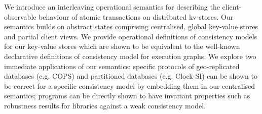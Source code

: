 
We introduce an interleaving operational semantics for describing the
client-observable behaviour of atomic transactions on distributed
kv-stores. Our semantics builds on abstract states comprising
centralised, global key-value stores and partial client views.  We provide
operational definitions of consistency models for our key-value stores which
are shown to be equivalent to the well-known declarative definitions
of consistency model for execution graphs. We explore  two
immediate applications of our semantics: specific protocols of 
geo-replicated databases (e.g. COPS) and partitioned databases
(e.g. Clock-SI) can be shown to be correct for a specific consistency
model by embedding them in our centralised semantics; 
programs can be directly shown to have invariant properties such as 
robustness results for libraries  against a weak consistency model.
